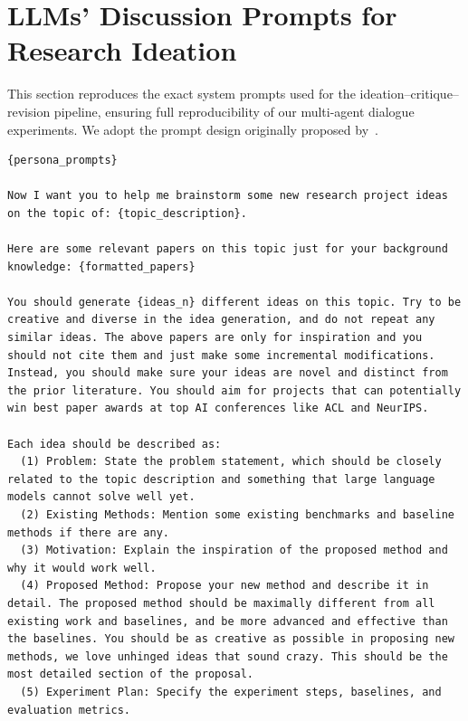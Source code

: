 \section{LLMs' Discussion Prompts for Research Ideation}
\label{sec:discussion_prompts}
\noindent This section reproduces the exact system prompts used for the ideation–critique–revision pipeline, ensuring full reproducibility of our multi-agent dialogue experiments. We adopt the prompt design originally proposed by~\citet{si2025can}.

{\centering
\begin{tcolorbox}[
    colframe=black!50!white, 
    colback=black!10!white, 
    title=Initial Idea Generation Prompt, 
    width=0.95\textwidth,
    boxsep=3pt
]
\footnotesize
\begin{Verbatim}[breaklines, breakanywhere=true, obeytabs=true]
{persona_prompts}

Now I want you to help me brainstorm some new research project ideas on the topic of: {topic_description}.

Here are some relevant papers on this topic just for your background knowledge: {formatted_papers}

You should generate {ideas_n} different ideas on this topic. Try to be creative and diverse in the idea generation, and do not repeat any similar ideas. The above papers are only for inspiration and you should not cite them and just make some incremental modifications. Instead, you should make sure your ideas are novel and distinct from the prior literature. You should aim for projects that can potentially win best paper awards at top AI conferences like ACL and NeurIPS.

Each idea should be described as:
  (1) Problem: State the problem statement, which should be closely related to the topic description and something that large language models cannot solve well yet.
  (2) Existing Methods: Mention some existing benchmarks and baseline methods if there are any.
  (3) Motivation: Explain the inspiration of the proposed method and why it would work well.
  (4) Proposed Method: Propose your new method and describe it in detail. The proposed method should be maximally different from all existing work and baselines, and be more advanced and effective than the baselines. You should be as creative as possible in proposing new methods, we love unhinged ideas that sound crazy. This should be the most detailed section of the proposal.
  (5) Experiment Plan: Specify the experiment steps, baselines, and evaluation metrics.


\end{Verbatim}
\end{tcolorbox}}
